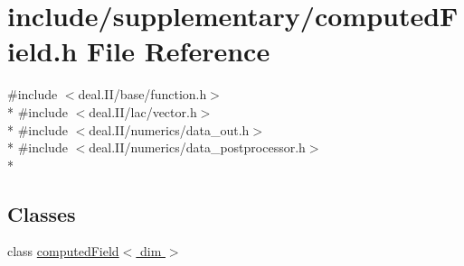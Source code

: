 \section{include/supplementary/computed\-Field.h File Reference}
\label{computed_field_8h}
{\ttfamily \#include $<$deal.\-I\-I/base/function.\-h$>$}\\*
{\ttfamily \#include $<$deal.\-I\-I/lac/vector.\-h$>$}\\*
{\ttfamily \#include $<$deal.\-I\-I/numerics/data\-\_\-out.\-h$>$}\\*
{\ttfamily \#include $<$deal.\-I\-I/numerics/data\-\_\-postprocessor.\-h$>$}\\*
\subsection*{Classes}
\begin{DoxyCompactItemize}
\item 
class \hyperlink{classcomputed_field}{computed\-Field$<$ dim $>$}
\end{DoxyCompactItemize}
